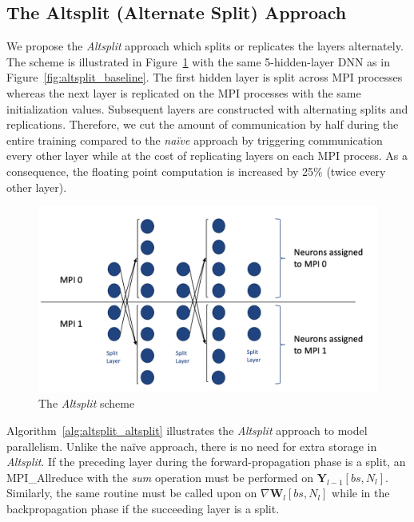 \subsection{The Altsplit (Alternate Split) Approach}
We propose the \emph{Altsplit} approach which splits or replicates the layers 
alternately. The scheme is illustrated in Figure~\ref{fig:altsplit_scheme} with 
the same 5-hidden-layer DNN as in Figure~\ref{fig:altsplit_baseline}. The first 
hidden layer is split across MPI processes whereas the next layer is replicated 
on the MPI processes with the same initialization values. Subsequent layers are 
constructed with alternating splits and replications. Therefore, we cut the 
amount of communication by half during the entire training compared to the 
\emph{na\"{i}ve} approach by triggering communication every other layer while at 
the cost of replicating layers on each MPI process. As a consequence, the floating
point computation is increased by 25\% (twice every other layer).
\begin{figure}[H]
    \centerline{\includegraphics[scale=0.60]{altsplit/figs/altsplit.png}}
    \caption{The \emph{Altsplit} scheme}
    \label{fig:altsplit_scheme}
\end{figure}

Algorithm~\ref{alg:altsplit_altsplit} illustrates the \emph{Altsplit} approach 
to model parallelism. Unlike the na\"{i}ve approach, there is no need for extra 
storage in \emph{Altsplit}. If the preceding layer during the 
forward-propagation phase is a split, an MPI\_Allreduce with the \textit{sum} 
operation must be performed on $\pmb{Y}_{l-1}[bs, N_{l}]$. Similarly, the same 
routine must be called upon on $\nabla \pmb{W}_l[bs, N_l]$ while in the 
backpropagation phase if the succeeding layer is a split.

